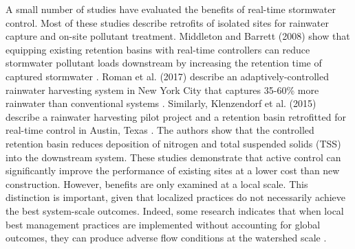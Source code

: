 A small number of studies have evaluated the benefits of real-time stormwater control. Most of these studies describe retrofits of isolated sites for rainwater capture and on-site pollutant treatment. Middleton and Barrett (2008) show that equipping existing retention basins with real-time controllers can reduce stormwater pollutant loads downstream by increasing the retention time of captured stormwater
\cite{Middleton_2008}. Roman et al. (2017) describe an adaptively-controlled rainwater harvesting system in New York City that captures 35-60\% more rainwater than conventional systems \cite{Roman_2017}. Similarly, Klenzendorf et al. (2015) describe a rainwater harvesting pilot project and a retention basin retrofitted for real-time control in Austin, Texas \cite{Klenzendorf_2015}. The authors show that the controlled retention basin reduces deposition of nitrogen and total suspended solids (TSS) into the downstream system. These studies demonstrate that active control can significantly improve the performance of existing sites at a lower cost than new construction. However, benefits are only examined at a local scale. This distinction is important, given that localized practices do not necessarily achieve the best system-scale outcomes. Indeed, some research indicates that when local best management practices are implemented without accounting for global outcomes, they can produce adverse flow conditions at the watershed scale \cite{Emerson_2005}.


